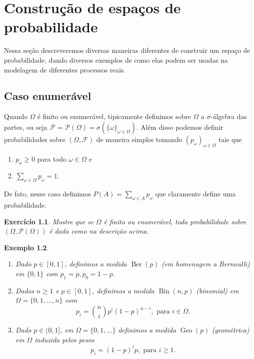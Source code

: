 \documentclass[reqno, draft]{book}
\newcommand*\1{\mathds{1}}
\newtheorem{example}{Exemplo}[section]
\newtheorem{exercise}[example]{Exercício}
\DeclareMathOperator{\Ber}{Ber}
\DeclareMathOperator{\Geo}{Geo}
\DeclareMathOperator{\Bin}{Bin}
\begin{document}
\chapter{Construção de espaços de probabilidade}

Nessa seção descreveremos diversas maneiras diferentes de construir um espaço de probabilidade, dando diversos exemplos de como elas podem ser usadas na modelagem de diferentes processos reais.

\section{Caso enumerável}

Quando $\Omega$ é finito ou enumerável, tipicamente definimos sobre $\Omega$ a $\sigma$-álgebra das partes, ou seja $\mathcal{F} = \mathcal{P}(\Omega) = \sigma(\{\omega\}_{\omega \in \Omega})$.
Além disso podemos definir probabilidades sobre $(\Omega, \mathcal{F})$ de maneira simples tomando $(p_\omega)_{\omega \in \Omega}$ tais que
\begin{enumerate}[\quad a)]
\item $p_\omega \geq 0$ para todo $\omega \in \Omega$ e
\item $\sum_{\omega \in \Omega} p_\omega = 1$.
\end{enumerate}
De fato, nesse caso definimos $P(A) = \sum_{\omega \in A} p_\omega$ que claramente define uma probabilidade.

\begin{exercise}
  Mostre que se $\Omega$ é finito ou enumerável, toda probabilidade sobre $(\Omega, \mathcal{P}(\Omega))$ é dada como na descrição acima.
\end{exercise}

\begin{example} \mbox{}
  \begin{enumerate}[\quad a)]
  \item Dado $p \in [0,1]$, definimos a medida $\Ber(p)$  (em homenagem a Bernoulli) em $\{0,1\}$ com $p_1 = p, p_0 = 1-p$.
  \item Dados $n \geq 1$ e $p \in [0,1]$, definimos a medida $\Bin(n,p)$  (binomial) em $\Omega = \{0, 1, \dots, n\}$ com
    \begin{equation}
      p_i = \binom ni p^i (1-p)^{n-i}, \text{ para $i \in \Omega$.}
    \end{equation}
  \item Dado $p \in (0,1]$, em $\Omega = \{0, 1, \dots\}$ definimos a medida $\Geo(p)$  (geométrica) em $\Omega$ induzida pelos pesos
  \begin{equation}
    p_i = (1-p)^i p, \text{ para $i \geq 1$.}
  \end{equation}
  \end{enumerate}
\end{example}
\end{document}
